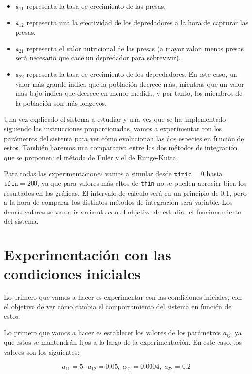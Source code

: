\documentclass[11pt,a4paper]{article}
\begin{document}
\begin{itemize}[label=\textbullet]
	\item $a_{11}$ representa la tasa de crecimiento de las presas.
	\item $a_{12}$ representa una la efectividad de los depredadores a la hora de
	capturar las presas.
	\item $a_{21}$ representa el valor nutricional de las presas (a mayor valor, menos
	presas será necesario que cace un depredador para sobrevivir).
	\item $a_{22}$ representa la tasa de crecimiento de los depredadores. En este caso,
	un valor más grande indica que la población decrece más, mientras que un valor más
	bajo indica que decrece en menor medida, y por tanto, los miembros de la población
	son más longevos.
\end{itemize}

Una vez explicado el sistema a estudiar y una vez que se ha implementado siguiendo
las instrucciones proporcionadas, vamos a experimentar con los parámetros del sistema
para ver cómo evolucionan las dos especies en función de estos. También haremos
una comparativa entre los dos métodos de integración que se proponen: el método de Euler
y el de Runge-Kutta.

Para todas las experimentaciones vamos a simular desde $\texttt{tinic} = 0$ hasta $\texttt{tfin} = 200$,
ya que para valores más altos de \texttt{tfin} no se pueden apreciar bien
los resultados en las gráficas. El intervalo de cálculo será en un principio de 0.1, pero a la hora
de comparar los distintos métodos de integración será variable. Los demás valores se van
a ir variando con el objetivo de estudiar el funcionamiento del sistema.

\section{Experimentación con las condiciones iniciales}

Lo primero que vamos a hacer es experimentar con las condiciones iniciales, con el
objetivo de ver cómo cambia el comportamiento del sistema en función de estos.

Lo primero que vamos a hacer es establecer los valores de los parámetros $a_{ij}$,
ya que estos se mantendrán fijos a lo largo de la experimentación. En este caso,
los valores son los siguientes:

$$
	a_{11} = 5, \; a_{12} = 0.05, \; a_{21} = 0.0004, \; a_{22} = 0.2
$$
\end{document}
